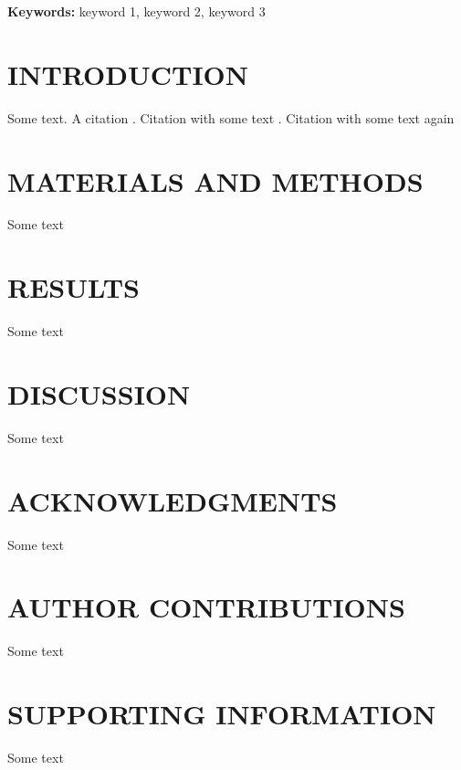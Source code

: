 \documentclass[letterpaper,12pt]{article}
\begin{document}
\par \noindent \textbf{Keywords:} keyword 1, keyword 2, keyword 3




\clearpage
\section{INTRODUCTION}
\par Some text. A citation \citep{wang2015stem}. Citation with some text \citep[here is some text before the citation;][]{wang2015stem}. Citation with some text again \citep[][some text after the citation]{holtta2017steady}




\section{MATERIALS AND METHODS}
\par Some text




\section{RESULTS}
\par Some text




\section{DISCUSSION}
\par Some text




\clearpage
\section*{ACKNOWLEDGMENTS}
\par Some text




\section*{AUTHOR CONTRIBUTIONS}
\par Some text




\section*{SUPPORTING INFORMATION}
\par Some text
\end{document}
